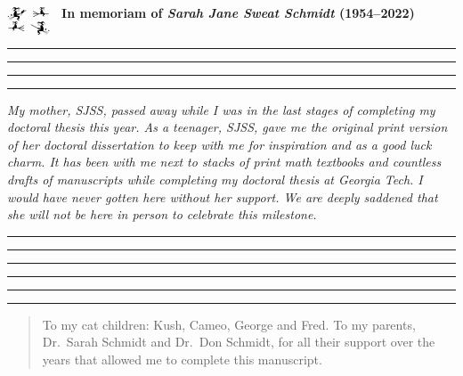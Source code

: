 \documentclass[12pt,reqno,a4letter]{article}
\makeatletter
\numberwithin{figure}{section}
\numberwithin{table}{section}
\numberwithin{equation}{section}
\renewcommand{\lstlistlistingname}{List of Source Code}
\renewcommand\lstlistoflistings{\bgroup
  \let\contentsname\lstlistlistingname
  \def\l@lstlisting##1##2{\@dottedtocline{1}{0em}{5.5em}{##1}{##2}}
  \let\lst@temp\@starttoc \def\@starttoc##1{\lst@temp{lol}}%
  \tableofcontents \egroup}
\theoremstyle{plain}
\numberwithin{theorem}{section}
\theoremstyle{definition}
\makeatother
\begin{document}
\newpage
{}
\begin{center}
\hspace*{0.075cm}
\hspace*{0.075cm}
 \\
\bigskip
{\small$\mathwitch*\ \overrightwitchonbroom{}$\ }
{\textbf{In memoriam of \textit{Sarah Jane Sweat Schmidt} (1954--2022)}} 
{\ \small$\overleftwitchonbroom{}\ \reversemathwitch$}
\end{center}
\hrule\hrule\hrule\hrule\bigskip
\noindent
{\small\it
My mother, SJSS, passed away while I was in the last stages 
of completing my doctoral thesis this year. 
As a teenager, SJSS, gave me the original print version of her doctoral 
dissertation to keep with me for inspiration and as a good luck charm. 
It has been with me next to stacks of print math textbooks and countless drafts of manuscripts 
while completing my doctoral thesis at Georgia Tech. 
I would have never gotten here without her support. 
We are deeply saddened that she will not be here in person 
to celebrate this milestone. 
} 
\medskip
\begin{center}
\end{center}

\newpage
\setcounter{tocdepth}{2}
\renewcommand{\contentsname}{Table of Contents}
\tableofcontents
\bigskip\bigskip\hrule\hrule\hrule\hrule\hrule\hrule\smallskip
{}
\listoftables
\renewcommand{\thetable}{\textbf{\thesection.\arabic{table}}}
\bigskip
{}
\listoffigures
\renewcommand{\thefigure}{\textbf{\arabic{section}.\arabic{figure}}}
\bigskip
{}
\lstlistoflistings

\newpage
{}
\vspace*{\fill}
\renewcommand{\abstractname}{Acknowledgments}
\begin{abstract}
\normalsize\noindent
To my cat children: Kush, Cameo, George and Fred. 
To my parents, Dr.~Sarah Schmidt and Dr.~Don Schmidt, for all their 
support over the years that allowed me to complete this manuscript.
\end{abstract}
\vspace*{\fill}
\end{document}
